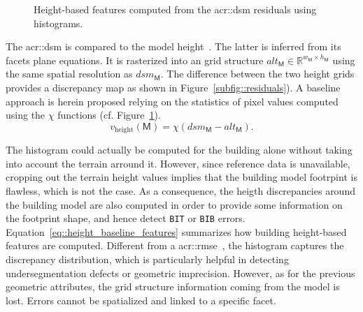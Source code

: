         \begin{figure}[htb]
            \centering
            
            \caption{
                \label{fig::height_baseline_features}
                Height-based features computed from the \gls{acr::dsm} residuals using histograms.
            }
        \end{figure}

        The \gls{acr::dsm} is compared to the model height~\parencite{bredif20073d,zebedin2008fusion}.
        The latter is inferred from its facets plane equations.
        It is rasterized into an grid structure $alt_{\mathsf{M}} \in \mathbb{R}^{w_{\mathsf{M}} \times h_{\mathsf{M}}}$ using the same spatial resolution as $dsm_{\mathsf{M}}$.
        The difference between the two height grids provides a discrepancy map as shown in Figure~\ref{subfig::residuals}).
        A baseline approach is herein proposed relying on the statistics of pixel values computed using the $\chi$ functions (cf. Figure~\ref{fig::height_baseline_features}).\\

        \begin{equation}
            \label{eq::height_baseline_features}
            v_{\text{height}}\left(\mathsf{M}\right) = \chi \left( dsm_{\mathsf{M}} - alt_{\mathsf{M}} \right).
        \end{equation}

        The histogram could actually be computed for the building alone without taking into account the terrain arround it.
        However, since reference data is unavailable, cropping out the terrain height values implies that the building model footrpint is flawless, which is not the case.
        As a consequence, the heigth discrepancies around the building model are also computed in order to provide some information on the footprint shape, and hence detect \texttt{BIT} or \texttt{BIB} errors.\\

        Equation~\ref{eq::height_baseline_features} summarizes how building height-based features are computed.
        Different from a \gls{acr::rmse}~\parencite{lafarge2012creating,poullis2013framework}, the histogram captures the discrepancy distribution, which is particularly helpful in detecting undersegmentation defects or geometric imprecision.
        However, as for the previous geometric attributes, the grid structure information coming from the model is lost.
        Errors cannot be spatialized and linked to a specific facet.


